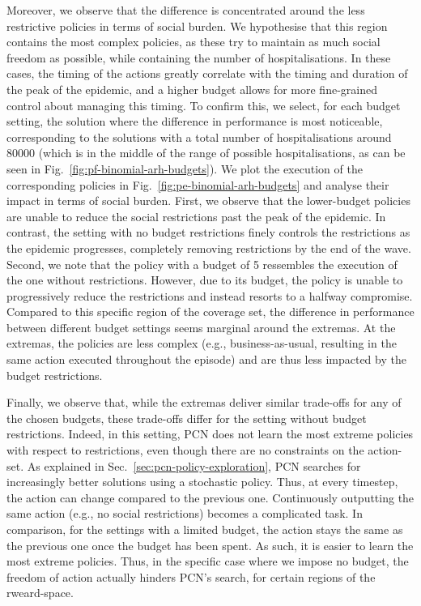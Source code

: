 \documentclass{article}
\begin{document}
Moreover, we observe that the difference is concentrated around the less restrictive policies in terms of social burden. We hypothesise that this region contains the most complex policies, as these try to maintain as much social freedom as possible, while containing the number of hospitalisations. In these cases, the timing of the actions greatly correlate with the timing and duration of the peak of the epidemic, and a higher budget allows for more fine-grained control about managing this timing. To confirm this, we select, for each budget setting, the solution where the difference in performance is most noticeable, corresponding to the solutions with a total number of hospitalisations around $80000$ (which is in the middle of the range of possible hospitalisations, as can be seen in Fig.~\ref{fig:pf-binomial-arh-budgets}). We plot the execution of the corresponding policies in Fig.~\ref{fig:pe-binomial-arh-budgets} and analyse their impact in terms of social burden. First, we observe that the lower-budget policies are unable to reduce the social restrictions past the peak of the epidemic. In contrast, the setting with no budget restrictions finely controls the restrictions as the epidemic progresses, completely removing restrictions by the end of the wave. Second, we note that the policy with a budget of 5 ressembles the execution of the one without restrictions. However, due to its budget, the policy is unable to progressively reduce the restrictions and instead resorts to a halfway compromise. Compared to this specific region of the coverage set, the difference in performance between different budget settings seems marginal around the extremas. At the extremas, the policies are less complex (e.g., business-as-usual, resulting in the same action executed throughout the episode) and are thus less impacted by the budget restrictions.

Finally, we observe that, while the extremas deliver similar trade-offs for any of the chosen budgets, these trade-offs differ for the setting without budget restrictions. Indeed, in this setting, PCN does not learn the most extreme policies with respect to restrictions, even though there are no constraints on the action-set. As explained in Sec.~\ref{sec:pcn-policy-exploration}, PCN searches for increasingly better solutions using a stochastic policy. Thus, at every timestep, the action can change compared to the previous one. Continuously outputting the same action (e.g., no social restrictions) becomes a complicated task. In comparison, for the settings with a limited budget, the action stays the same as the previous one once the budget has been spent. As such, it is easier to learn the most extreme policies. Thus, in the specific case where we impose no budget, the freedom of action actually hinders PCN's search, for certain regions of the rweard-space.
\end{document}
